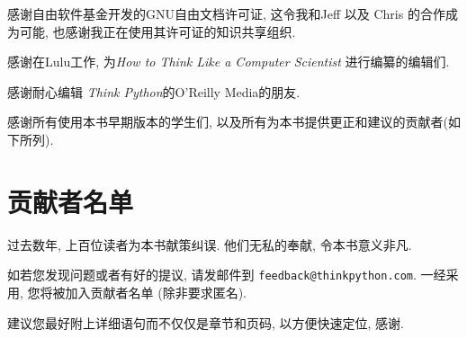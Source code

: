 \documentclass[10pt]{book}
\begin{document}
感谢自由软件基金开发的GNU自由文档许可证, 
这令我和Jeff 以及 Chris 的合作成为可能,
也感谢我正在使用其许可证的知识共享组织. 


感谢在Lulu工作, 为{\em How to Think Like a Computer Scientist}
进行编纂的编辑们. 

感谢耐心编辑 {\em Think Python}的O'Reilly Media的朋友. 

感谢所有使用本书早期版本的学生们, 以及所有为本书提供更正和建议的贡献者(如下所列). 


\section*{贡献者名单}

过去数年, 上百位读者为本书献策纠误. 
他们无私的奉献, 令本书意义非凡. 

如若您发现问题或者有好的提议, 请发邮件到 
{\tt feedback@thinkpython.com}. 一经采用, 您将被加入贡献者名单
(除非要求匿名).

建议您最好附上详细语句而不仅仅是章节和页码, 以方便快速定位, 感谢. 
\end{document}
